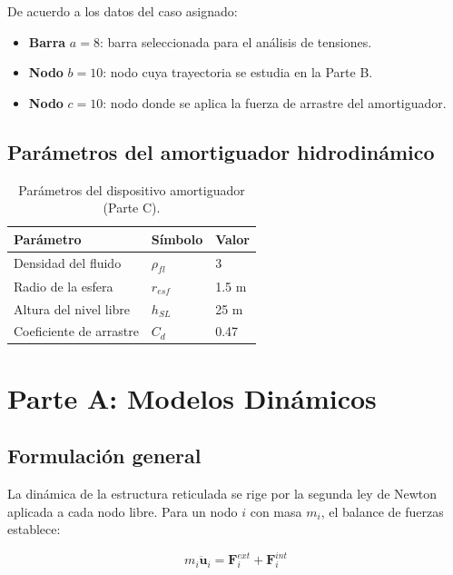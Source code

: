 \documentclass[12pt]{article}
\begin{document}
De acuerdo a los datos del caso asignado:
\begin{itemize}
    \item \textbf{Barra} $a = 8$: barra seleccionada para el análisis de tensiones.
    \item \textbf{Nodo} $b = 10$: nodo cuya trayectoria se estudia en la Parte B.
    \item \textbf{Nodo} $c = 10$: nodo donde se aplica la fuerza de arrastre del amortiguador.
\end{itemize}

\subsection{Parámetros del amortiguador hidrodinámico}

\begin{table}[H]
    \centering
    \caption{Parámetros del dispositivo amortiguador (Parte C).}
    \label{tab:amortiguador}
    \begin{tabular}{lll}
        \toprule
        \textbf{Parámetro} & \textbf{Símbolo} & \textbf{Valor} \\
        \midrule
        Densidad del fluido & $\rho_{fl}$ & 3 \\
        Radio de la esfera & $r_{esf}$ & 1.5 m \\
        Altura del nivel libre & $h_{SL}$ & 25 m \\
        Coeficiente de arrastre & $C_d$ & 0.47 \\
        \bottomrule
    \end{tabular}
\end{table}

\section{Parte A: Modelos Dinámicos}

\subsection{Formulación general}

La dinámica de la estructura reticulada se rige por la segunda ley de Newton aplicada a cada nodo libre. Para un nodo $i$ con masa $m_i$, el balance de fuerzas establece:

\begin{equation}
    m_i \ddot{\mathbf{u}}_i = \mathbf{F}_i^{ext} + \mathbf{F}_i^{int}
    \label{eq:newton}
\end{equation}
\end{document}
